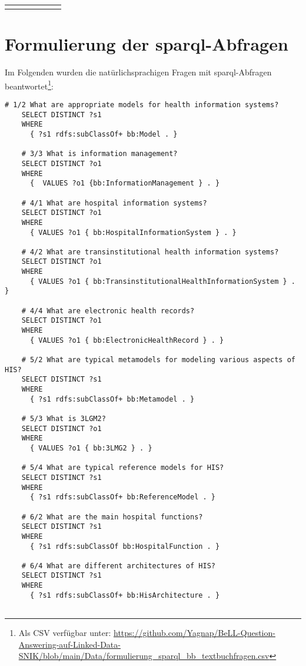 \begin{longtable}{c p{6.5 cm} c c c c}
    \bottomrule \\
  \end{longtable}
  
\section[Formulierung der SPARQL-Abfragen]{Formulierung der \ac{sparql}-Abfragen}\label{sub:sparqltextbuchfragen}

Im Folgenden wurden die natürlichsprachigen Fragen mit \ac{sparql}-Abfragen beantwortet\footnote{Als CSV verfügbar unter:
\url{https://github.com/Yagnap/BeLL-Question-Answering-auf-Linked-Data-SNIK/blob/main/Data/formulierung\_sparql\_bb\_textbuchfragen.csv}}:

\begin{lstlisting}[language=SPARQL]
    # 1/2 What are appropriate models for health information systems?
    SELECT DISTINCT ?s1
    WHERE
      { ?s1 rdfs:subClassOf+ bb:Model . }
    
    # 3/3 What is information management?
    SELECT DISTINCT ?o1
    WHERE
      {  VALUES ?o1 {bb:InformationManagement } . }
    
    # 4/1 What are hospital information systems?
    SELECT DISTINCT ?o1
    WHERE
      { VALUES ?o1 { bb:HospitalInformationSystem } . }
    
    # 4/2 What are transinstitutional health information systems?
    SELECT DISTINCT ?o1
    WHERE
      { VALUES ?o1 { bb:TransinstitutionalHealthInformationSystem } . }
    
    # 4/4 What are electronic health records?
    SELECT DISTINCT ?o1
    WHERE
      { VALUES ?o1 { bb:ElectronicHealthRecord } . }
    
    # 5/2 What are typical metamodels for modeling various aspects of HIS?
    SELECT DISTINCT ?s1
    WHERE
      { ?s1 rdfs:subClassOf+ bb:Metamodel . }
    
    # 5/3 What is 3LGM2?
    SELECT DISTINCT ?o1
    WHERE
      { VALUES ?o1 { bb:3LMG2 } . }
    
    # 5/4 What are typical reference models for HIS?
    SELECT DISTINCT ?s1
    WHERE
      { ?s1 rdfs:subClassOf+ bb:ReferenceModel . }
    
    # 6/2 What are the main hospital functions?
    SELECT DISTINCT ?s1
    WHERE
      { ?s1 rdfs:subClassOf bb:HospitalFunction . }
    
    # 6/4 What are different architectures of HIS?
    SELECT DISTINCT ?s1
    WHERE
      { ?s1 rdfs:subClassOf+ bb:HisArchitecture . }
    

\end{lstlisting}
